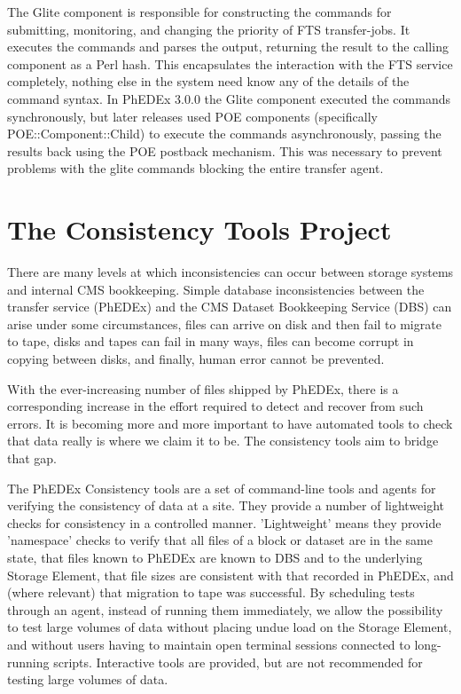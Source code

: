 \documentclass{PoS}
\begin{document}
The Glite component is responsible for constructing the commands for
submitting, monitoring, and changing the priority of FTS
transfer-jobs. It executes the commands and parses the output,
returning the result to the calling component as a Perl hash. This
encapsulates the interaction with the FTS service completely, nothing
else in the system need know any of the details of the command
syntax. In PhEDEx 3.0.0 the Glite component executed the commands
synchronously, but later releases used POE components (specifically
POE::Component::Child) to execute the commands asynchronously, passing
the results back using the POE postback mechanism. This was necessary
to prevent problems with the glite commands blocking the entire
transfer agent.

\section{The Consistency Tools Project}

There are many levels at which inconsistencies can occur between
storage systems and internal CMS bookkeeping. Simple database
inconsistencies between the transfer service (PhEDEx) and the CMS
Dataset Bookkeeping Service (DBS) can arise under some circumstances,
files can arrive on disk and then fail to migrate to tape, disks and
tapes can fail in many ways, files can become corrupt in copying
between disks, and finally, human error cannot be prevented.

With the ever-increasing number of files shipped by PhEDEx, there is a
corresponding increase in the effort required to detect and recover
from such errors. It is becoming more and more important to have
automated tools to check that data really is where we claim it to
be. The consistency tools aim to bridge that gap.

The PhEDEx Consistency tools are a set of command-line tools and
agents for verifying the consistency of data at a site. They provide a
number of lightweight checks for consistency in a controlled
manner. 'Lightweight' means they provide 'namespace' checks to verify
that all files of a block or dataset are in the same state, that files
known to PhEDEx are known to DBS and to the underlying Storage
Element, that file sizes are consistent with that recorded in PhEDEx,
and (where relevant) that migration to tape was successful. By
scheduling tests through an agent, instead of running them
immediately, we allow the possibility to test large volumes of data
without placing undue load on the Storage Element, and without users
having to maintain open terminal sessions connected to long-running
scripts. Interactive tools are provided, but are not recommended for
testing large volumes of data.
\end{document}
